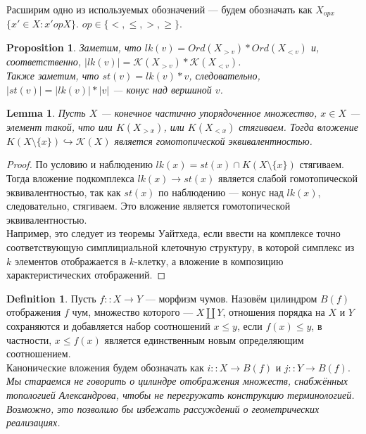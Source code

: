 \documentclass[a4paper, 12pt]{article}
\newtheorem{proposition}{Proposition}
\newtheorem{lemma}{Lemma}
\theoremstyle{definition}
\newtheorem{definition}{Definition}
\theoremstyle{remark}
\begin{document}
Расширим одно из используемых обозначений ---  будем обозначать как $X_{op x}$ $\{x' \in X: x' op X\}$. $op \in \{<, \leqslant, >, \geqslant\}$.

\begin{proposition}
  Заметим, что $lk(v) = Ord(X_{>v}) * Ord(X_{<v})$ и, соответственно, $|lk(v)| = \mathcal{K}(X_{>v}) * \mathcal{K}(X_{<v})$.\\
  Также заметим, что $st(v) = lk(v) * v$, следовательно, $|st(v)| = |lk(v)| * |v|$ --- конус над вершиной $v$.
\end{proposition}

\begin{lemma}
  Пусть $X$ --- конечное частично упорядоченное множество, $x \in X$ --- элемент такой, что или $K(X_{>x})$, или $K(X_{<x})$ стягиваем. Тогда вложение $K(X\setminus\{x\}) \hookrightarrow \mathcal{K}(X)$ является гомотопической эквивалентностью.
\end{lemma}
\begin{proof}
  По условию и наблюдению $lk(x) = st(x) \cap K(X \setminus \{x\})$ стягиваем. Тогда вложение подкомплекса $lk(x) \to st(x)$ является слабой гомотопической эквивалентностью, так как $st(x)$ по наблюдению --- конус над $lk(x)$, следовательно, стягиваем. Это вложение является гомотопической эквивалентностью.\\
  Например, это следует из теоремы Уайтхеда, если ввести на комплексе точно соответствующую симплициальной клеточную структуру, в которой симплекс из $k$ элементов отображается в $k$-клетку, а вложение в композицию характеристических отображений.
\end{proof}

\begin{definition}
  Пусть $f :: X \to Y$ --- морфизм чумов. Назовём цилиндром $B(f)$ отображения $f$ чум, множество которого --- $X \coprod Y$, отношения порядка на $X$ и $Y$ сохраняются и добавляется набор соотношений $x \leqslant y$, если $f(x) \leqslant y$, в частности, $x \leqslant f(x)$ является единственным новым определяющим соотношением.\\
  Канонические вложения будем обозначать как $i :: X \to B(f)$ и $j :: Y \to B(f)$.
  \textit{Мы стараемся не говорить о цилиндре отображения множеств, снабжённых топологией Александрова, чтобы не перегружать конструкцию терминологией. Возможно, это позволило бы избежать рассуждений о геометрических реализациях.}
\end{definition}
\end{document}

